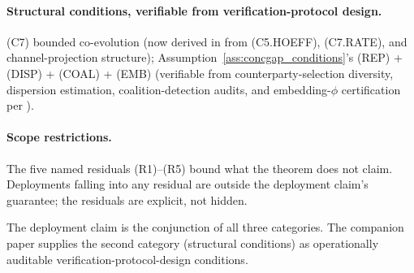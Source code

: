 \paragraph{Structural conditions, verifiable from
verification-protocol design.}  (C7) bounded co-evolution (now
derived in \citep[Theorem~1]{lasser2026foundations} from
(C5.HOEFF), (C7.RATE), and channel-projection structure);
Assumption~\ref{ass:concgap_conditions}'s (REP) + (DISP) + (COAL)
+ (EMB) (verifiable from counterparty-selection diversity,
dispersion estimation, coalition-detection audits, and
embedding-$\phi$ certification per
\citep[\S 6]{lasser2026foundations}).

\paragraph{Scope restrictions.}  The five named residuals
(R1)--(R5) bound what the theorem does not claim.  Deployments
falling into any residual are outside the deployment claim's
guarantee; the residuals are explicit, not hidden.

The deployment claim is the conjunction of all three categories.
The companion paper supplies the second category (structural
conditions) as operationally auditable verification-protocol-design
conditions.
